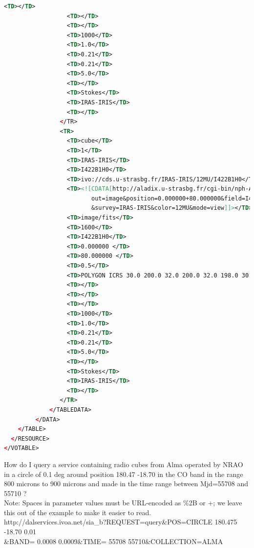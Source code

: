 \documentclass[11pt,a4paper]{ivoa}
\begin{document}
\begin{lstlisting}[basicstyle=\scriptsize,language=XML]
                  <TD></TD> 
                  <TD></TD> 
                  <TD></TD> 
                  <TD>1000</TD> 
                  <TD>1.0</TD> 
                  <TD>0.21</TD> 
                  <TD>0.21</TD> 
                  <TD>5.0</TD> 
                  <TD></TD> 
                  <TD>Stokes</TD> 
                  <TD>IRAS-IRIS</TD> 
                  <TD></TD> 
                </TR> 
                <TR> 
                  <TD>cube</TD> 
                  <TD>1</TD> 
                  <TD>IRAS-IRIS</TD> 
                  <TD>I422B1H0</TD> 
                  <TD>ivo://cds.u-strasbg.fr/IRAS-IRIS/12MU/I422B1H0</TD> 
                  <TD><![CDATA[http://aladix.u-strasbg.fr/cgi-bin/nph-Aladin++dev.cgi?
                         out=image&position=0.000000+80.000000&field=I422B1H0
                         &survey=IRAS-IRIS&color=12MU&mode=view]]></TD> 
                  <TD>image/fits</TD> 
                  <TD>1600</TD> 
                  <TD>I422B1H0</TD> 
                  <TD>0.000000 </TD> 
                  <TD>80.000000 </TD> 
                  <TD>0.5</TD> 
                  <TD>POLYGON ICRS 30.0 200.0 32.0 200.0 32.0 198.0 30.0 198.0</TD> 
                  <TD></TD> 
                  <TD></TD> 
                  <TD></TD> 
                  <TD>1000</TD> 
                  <TD>1.0</TD> 
                  <TD>0.21</TD> 
                  <TD>0.21</TD> 
                  <TD>5.0</TD> 
                  <TD></TD> 
                  <TD>Stokes</TD> 
                  <TD>IRAS-IRIS</TD> 
                  <TD></TD> 
                </TR>
             </TABLEDATA> 
         </DATA> 
    </TABLE> 
  </RESOURCE> 
</VOTABLE>
\end{lstlisting}
         How do I query a service containing radio cubes from Alma operated by NRAO in a circle of 0.1 deg around position 180.47 -18.70 in the CO band in the range 800 microns to 900 microns and made in the time range between Mjd=55708 and 55710 ? \\
Note: Spaces in parameter values must be URL-encoded as \%2B or +; we leave this out of the example to make it easier to read.\\
{\footnotesize http://dalservices.ivoa.net/sia\_b?REQUEST=query\&POS=CIRCLE 180.475 -18.70 0.01 \\ \&BAND= 0.0008 0.0009\&TIME= 55708 55710\&COLLECTION=ALMA} 
\end{document}
